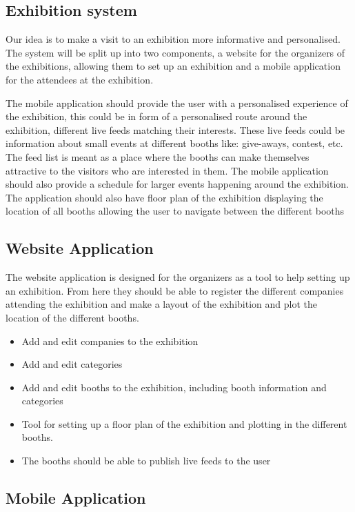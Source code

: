 \subsection*{Exhibition system}

Our idea is to make a visit to an exhibition more informative and personalised. The system will be split up into two components, a website for the organizers of the exhibitions, allowing them to set up an exhibition and a mobile application for the attendees at the exhibition.

The mobile application should provide the user with a personalised experience of the exhibition, this could be in form of a personalised route around the exhibition, different live feeds matching their interests. These live feeds could be information about small events at different booths like: give-aways, contest, etc. The feed list is meant as a place where the booths can make themselves attractive to the visitors who are interested in them. The mobile application should also provide a schedule for larger events happening around the exhibition. The application should also have floor plan of the exhibition displaying the location of all booths allowing the user to navigate between the different booths

\subsection*{Website Application}
The website application is designed for the organizers as a tool to help setting up an exhibition. From here they should be able to register the different companies attending the exhibition and make a layout of the exhibition and plot the location of the different booths.
\begin{itemize}
\item Add and edit companies to the exhibition
\item Add and edit categories
\item Add and edit booths to the exhibition, including booth information and categories
\item Tool for setting up a floor plan of the exhibition and plotting in the different booths.
\item The booths should be able to publish live feeds to the user
\end{itemize}
\subsection*{Mobile Application}

